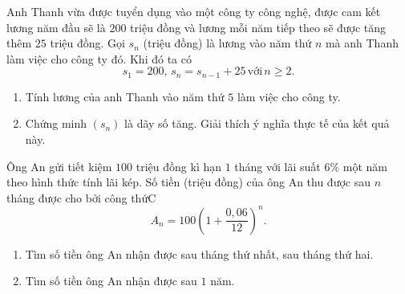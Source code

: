\begin{vd}%
	Anh Thanh vừa được tuyển dụng vào một công ty công nghệ, được cam kết lương năm đầu sẽ là $200$ triệu đồng và lương mỗi năm tiếp theo sẽ được tăng thêm $25$ triệu đồng. Gọi $s_n$ (triệu đồng) là lương vào năm thứ $n$ mà anh Thanh làm việc cho công ty đó. Khi đó ta có
	$$s_1=200,\, s_n=s_{n-1}+25\, \text{với}\, n \ge 2.$$
	\begin{enumerate}
		\item Tính lương của anh Thanh vào năm thứ $5$ làm việc cho công ty.
		\item Chứng minh $(s_n)$ là dãy số tăng. Giải thích ý nghĩa thực tế của kết quả này. 
	\end{enumerate}
\end{vd}

\begin{vd}%
	Ông An gửi tiết kiệm $100$ triệu đồng kì hạn $1$ tháng với lãi suất $6\%$ một năm theo hình thức tính lãi kép. Số tiền (triệu đồng) của ông An thu được sau $n$ tháng được cho bởi công thứC 
	$$A_n=100\left(1+\dfrac{0{,}06}{12}\right)^n.$$
	\begin{enumerate}
		\item Tìm số tiền ông An nhận được sau tháng thứ nhất, sau tháng thứ hai.
		\item Tìm số tiền ông An nhận được sau $1$ năm.
	\end{enumerate}
\end{vd}

